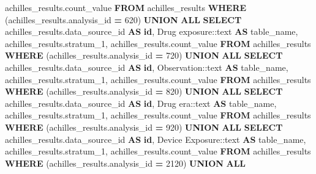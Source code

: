 \documentclass[
]{book}
\newenvironment{Shaded}{\begin{snugshade}}{\end{snugshade}}
\newcommand{\CharTok}[1]{\textcolor[rgb]{0.31,0.60,0.02}{#1}}
\newcommand{\DecValTok}[1]{\textcolor[rgb]{0.00,0.00,0.81}{#1}}
\newcommand{\KeywordTok}[1]{\textcolor[rgb]{0.13,0.29,0.53}{\textbf{#1}}}
\newcommand{\NormalTok}[1]{#1}
\newcommand{\OperatorTok}[1]{\textcolor[rgb]{0.81,0.36,0.00}{\textbf{#1}}}
\newcommand{\StringTok}[1]{\textcolor[rgb]{0.31,0.60,0.02}{#1}}
\begin{document}
\begin{Shaded}
\begin{Highlighting}[]
\NormalTok{           achilles\_results.count\_value}
          \KeywordTok{FROM}\NormalTok{ achilles\_results}
         \KeywordTok{WHERE}\NormalTok{ (achilles\_results.analysis\_id }\OperatorTok{=} \DecValTok{620}\NormalTok{)}
       \KeywordTok{UNION} \KeywordTok{ALL}
        \KeywordTok{SELECT}\NormalTok{ achilles\_results.data\_source\_id }\KeywordTok{AS} \KeywordTok{id}\NormalTok{,}
           \StringTok{\textquotesingle{}Drug exposure\textquotesingle{}}\NormalTok{:}\CharTok{:text} \KeywordTok{AS}\NormalTok{ table\_name,}
\NormalTok{           achilles\_results.stratum\_1,}
\NormalTok{           achilles\_results.count\_value}
          \KeywordTok{FROM}\NormalTok{ achilles\_results}
         \KeywordTok{WHERE}\NormalTok{ (achilles\_results.analysis\_id }\OperatorTok{=} \DecValTok{720}\NormalTok{)}
       \KeywordTok{UNION} \KeywordTok{ALL}
        \KeywordTok{SELECT}\NormalTok{ achilles\_results.data\_source\_id }\KeywordTok{AS} \KeywordTok{id}\NormalTok{,}
           \StringTok{\textquotesingle{}Observation\textquotesingle{}}\NormalTok{:}\CharTok{:text} \KeywordTok{AS}\NormalTok{ table\_name,}
\NormalTok{           achilles\_results.stratum\_1,}
\NormalTok{           achilles\_results.count\_value}
          \KeywordTok{FROM}\NormalTok{ achilles\_results}
         \KeywordTok{WHERE}\NormalTok{ (achilles\_results.analysis\_id }\OperatorTok{=} \DecValTok{820}\NormalTok{)}
       \KeywordTok{UNION} \KeywordTok{ALL}
        \KeywordTok{SELECT}\NormalTok{ achilles\_results.data\_source\_id }\KeywordTok{AS} \KeywordTok{id}\NormalTok{,}
           \StringTok{\textquotesingle{}Drug era\textquotesingle{}}\NormalTok{:}\CharTok{:text} \KeywordTok{AS}\NormalTok{ table\_name,}
\NormalTok{           achilles\_results.stratum\_1,}
\NormalTok{           achilles\_results.count\_value}
          \KeywordTok{FROM}\NormalTok{ achilles\_results}
         \KeywordTok{WHERE}\NormalTok{ (achilles\_results.analysis\_id }\OperatorTok{=} \DecValTok{920}\NormalTok{)}
       \KeywordTok{UNION} \KeywordTok{ALL}
        \KeywordTok{SELECT}\NormalTok{ achilles\_results.data\_source\_id }\KeywordTok{AS} \KeywordTok{id}\NormalTok{,}
           \StringTok{\textquotesingle{}Device Exposure\textquotesingle{}}\NormalTok{:}\CharTok{:text} \KeywordTok{AS}\NormalTok{ table\_name,}
\NormalTok{           achilles\_results.stratum\_1,}
\NormalTok{           achilles\_results.count\_value}
          \KeywordTok{FROM}\NormalTok{ achilles\_results}
         \KeywordTok{WHERE}\NormalTok{ (achilles\_results.analysis\_id }\OperatorTok{=} \DecValTok{2120}\NormalTok{)}
       \KeywordTok{UNION} \KeywordTok{ALL}

\end{Highlighting}
\end{Shaded}
\end{document}
